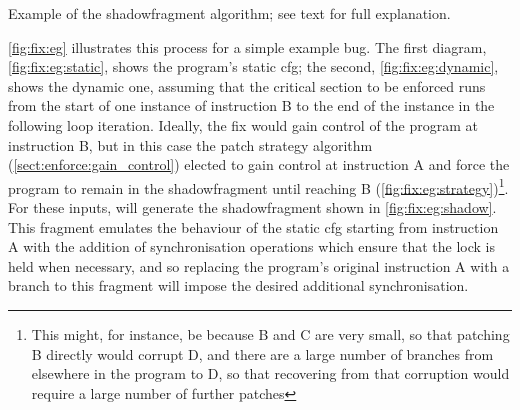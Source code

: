 \begin{sanefig}
{
    \label{fig:fix:eg:shadow}
  }
  {\hfill}
  \caption{Example of the \protect\gls{shadowfragment} algorithm; see
    text for full explanation.}
  \label{fig:fix:eg}
\end{sanefig}

\autoref{fig:fix:eg} illustrates this process for a simple example
bug.  The first diagram, \autoref{fig:fix:eg:static}, shows the
program's static \gls{cfg}; the second, \autoref{fig:fix:eg:dynamic},
shows the dynamic one, assuming that the critical section to be
enforced runs from the start of one instance of instruction B to the
end of the instance in the following loop iteration.  Ideally, the fix
would gain control of the program at instruction B, but in this case
the patch strategy algorithm (\autoref{sect:enforce:gain_control})
elected to gain control at instruction A and force the program to
remain in the \gls{shadowfragment} until reaching B
(\autoref{fig:fix:eg:strategy})\footnote{This might, for instance, be
  because B and C are very small, so that patching B directly would
  corrupt D, and there are a large number of branches from elsewhere
  in the program to D, so that recovering from that corruption would
  require a large number of further patches}.  For these inputs,
{\technique} will generate the \gls{shadowfragment} shown in
\autoref{fig:fix:eg:shadow}.  This fragment emulates the behaviour of
the static \gls{cfg} starting from instruction A with the addition of
synchronisation operations which ensure that the lock is held when
necessary, and so replacing the program's original instruction A with
a branch to this fragment will impose the desired additional
synchronisation.

